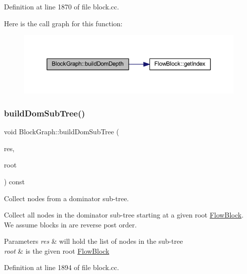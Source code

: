Definition at line 1870 of file block.\+cc.

Here is the call graph for this function\+:
\nopagebreak
\begin{figure}[H]
\begin{center}
\leavevmode
\includegraphics[width=350pt]{class_block_graph_afc33c821dd221280e2d73d24011a5aa7_cgraph}
\end{center}
\end{figure}
\mbox{\label{class_block_graph_a044fa551f0aae9c919884772774e11ee}} 
\subsubsection{\texorpdfstring{buildDomSubTree()}{buildDomSubTree()}}
{\footnotesize\ttfamily void Block\+Graph\+::build\+Dom\+Sub\+Tree (\begin{DoxyParamCaption}\item[{vector$<$ \mbox{\hyperlink{class_flow_block}{Flow\+Block}} $\ast$ $>$ \&}]{res,  }\item[{\mbox{\hyperlink{class_flow_block}{Flow\+Block}} $\ast$}]{root }\end{DoxyParamCaption}) const}



Collect nodes from a dominator sub-\/tree. 

Collect all nodes in the dominator sub-\/tree starting at a given root \mbox{\hyperlink{class_flow_block}{Flow\+Block}}. We assume blocks in are reverse post order. 
\begin{DoxyParams}{Parameters}
{\em res} & will hold the list of nodes in the sub-\/tree \\
\hline
{\em root} & is the given root \mbox{\hyperlink{class_flow_block}{Flow\+Block}} \\
\hline
\end{DoxyParams}


Definition at line 1894 of file block.\+cc.

